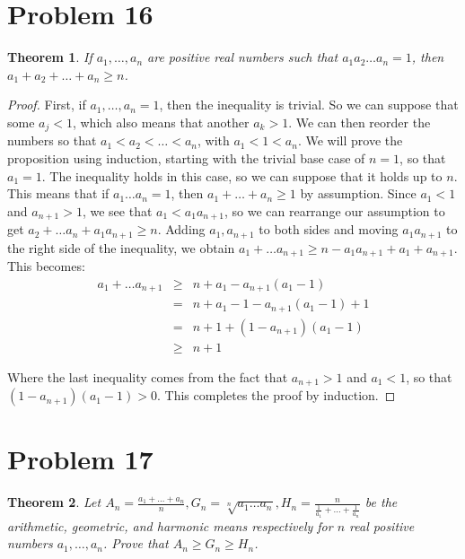 \documentclass[psamsfonts]{amsart}
\newtheorem{thm}{Theorem}[section]
\theoremstyle{definition}
\theoremstyle{remark}
\numberwithin{equation}{section}
\begin{document}
\section{Problem 16}

\begin{thm}
If $a_1, \ldots, a_n$ are positive real numbers such that $a_1 a_2 \ldots a_n = 1$, then $a_1 + a_2 + \ldots + a_n \geq n$. 
\end{thm}

\begin{proof}
First, if $a_1, \ldots, a_n = 1$, then the inequality is trivial. So we can suppose that some $a_j < 1$, which also means that another $a_k > 1$. We can then reorder the numbers so that $a_1 < a_2 < \ldots < a_n$, with $a_1 < 1 < a_n$. We will prove the proposition using induction, starting with the trivial base case of $n = 1$, so that $a_1 = 1$. The inequality holds in this case, so we can suppose that it holds up to $n$. This means that if $a_1 \ldots a_n = 1$, then $a_1 + \ldots + a_n \geq 1$ by assumption. Since $a_1 < 1$ and $a_{n+1} > 1$, we see that $a_1 < a_1 a_{n+1}$, so we can rearrange our assumption to get $a_2 + \ldots a_n + a_1 a_{n+1} \geq n$. Adding $a_1, a_{n+1}$ to both sides and moving $a_1 a_{n+1}$ to the right side of the inequality, we obtain $a_1 + \ldots a_{n+1} \geq n - a_1 a_{n+1} + a_1 + a_{n+1}$. This becomes:
\begin{eqnarray}
a_1 + \ldots a_{n+1} &\geq& n  + a_1 - a_{n+1} (a_1 - 1) \\
&=& n + a_1 -1 - a_{n+1} ( a_1 - 1) + 1 \\
&=& n + 1 + (1 - a_{n+1})(a_1 - 1) \\
&\geq& n + 1
\end{eqnarray}

Where the last inequality comes from the fact that $a_{n+1} > 1$ and $a_1 < 1$, so that $(1-a_{n+1})(a_1 - 1) > 0$. This completes the proof by induction.
\end{proof}

\section{Problem 17}

\begin{thm}
Let $A_n = \frac{a_1 + \ldots + a_n}{n}, G_n = \sqrt[n]{a_1 \ldots a_n }, H_n = \frac{n}{\frac{1}{a_1} + \ldots + \frac{1}{a_n}}$ be the arithmetic, geometric, and harmonic means respectively for $n$ real positive numbers $a_1, \ldots, a_n$. Prove that $A_n \geq G_n \geq H_n$. 
\end{thm}
\end{document}

